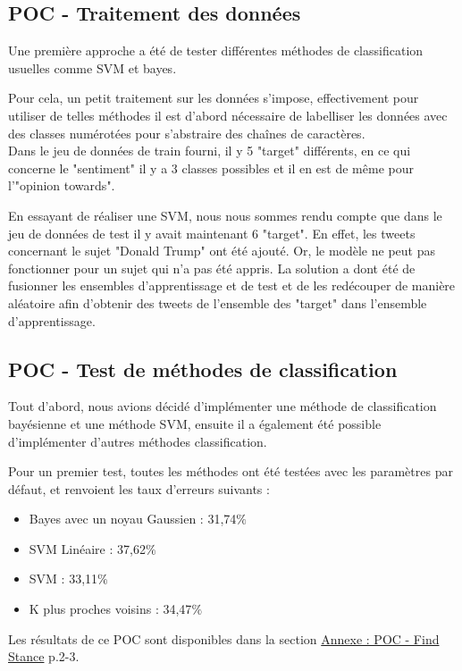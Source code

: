 \subsection{POC - Traitement des données}

Une première approche a été de tester différentes méthodes de classification usuelles comme SVM et bayes.

Pour cela, un petit traitement sur les données s'impose, effectivement pour utiliser de telles méthodes il est d'abord nécessaire de labelliser les données avec des classes numérotées pour s'abstraire des chaînes de caractères. \\
Dans le jeu de données de train fourni, il y 5 "target" différents, en ce qui concerne le "sentiment" il y a 3 classes possibles et il en est de même pour l'"opinion towards".

En essayant de réaliser une SVM, nous nous sommes rendu compte que dans le jeu de données de test il y avait maintenant 6 "target". En effet, les tweets concernant le sujet "Donald Trump" ont été ajouté. Or, le modèle ne peut pas fonctionner pour un sujet qui n'a pas été appris.
La solution a dont été de fusionner les ensembles d'apprentissage et de test et de les redécouper de manière aléatoire afin d'obtenir des tweets de l'ensemble des "target" dans l'ensemble d'apprentissage.

\subsection{POC - Test de méthodes de classification}

Tout d'abord, nous avions décidé d'implémenter une méthode de classification bayésienne et une méthode SVM, ensuite il a également été possible d'implémenter d'autres méthodes classification.

Pour un premier test, toutes les méthodes ont été testées avec les paramètres par défaut, et renvoient les taux d'erreurs suivants :
\begin{itemize}
\item Bayes avec un noyau Gaussien : 31,74$\%$
\item SVM Linéaire : 37,62$\%$
\item SVM : 33,11$\%$
\item K plus proches voisins : 34,47$\%$
\end{itemize}

Les résultats de ce POC sont disponibles dans la section \hyperref[annexe-stance-detection]{Annexe : POC - Find Stance} p.2-3.

